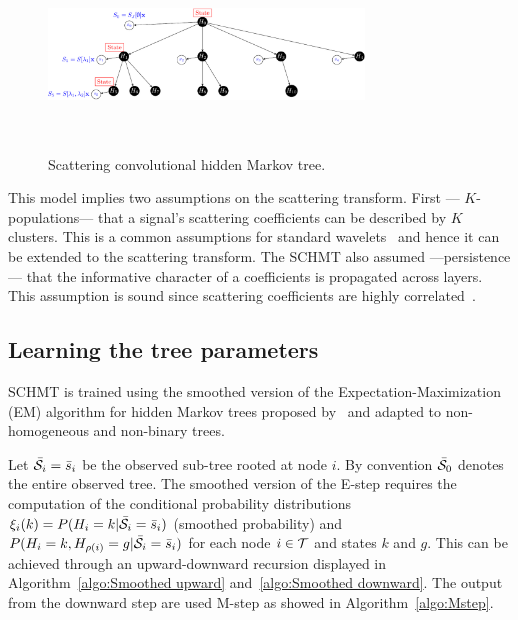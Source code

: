 \documentclass{article}
\begin{document}
    \begin{figure}
      \begin{center}
        \includegraphics[width=3.3in, height=2in, keepaspectratio]{scat_HMT_crop.pdf}
        \caption{Scattering convolutional hidden Markov tree.}
        \label{fig:SCHMT 1}
      \end{center}
      \vspace{-15pt}
    \end{figure}
    
    This model implies two assumptions on the scattering transform. First --- $K$-populations--- that a signal’s scattering coefficients can be described by $K$ clusters. This is a common assumptions for standard wavelets~\cite{kingsbury2001complex} and hence it can be extended to the scattering transform. The SCHMT also assumed ---persistence--- that the informative character of a coefficients is propagated across layers. This assumption is sound since scattering coefficients are highly correlated~\cite{oyallon2014deep}.
    
  \subsection{Learning the tree parameters}
    \label{subsec:SCHMT/Learning}    

    SCHMT is trained using the smoothed version of the Expectation-Maximization (EM) algorithm for hidden Markov trees proposed by~\cite{durand2001statistical} and adapted to non-homogeneous and non-binary trees.
    
    Let $\bar{\mathcal{S}}_{i}= \bar{s}_{i}$ be the observed sub-tree rooted at node $i$. By convention $\bar{\mathcal{S}}_{0}$ denotes the entire observed tree. The smoothed version of the E-step requires the computation of the conditional probability distributions $\xi_{i}(k) = P(H_{i}=k | \bar{\mathcal{S}}_{i}= \bar{s}_{i})$ (smoothed probability) and $P(H_{i}=k, H_{\rho(i)}=g | \bar{\mathcal{S}}_{i}= \bar{s}_{i})$ for each node $i \in \mathcal{T}$ and states $k$ and $g$. This can be achieved through an upward-downward recursion displayed in Algorithm~\ref{algo:Smoothed upward} and~\ref{algo:Smoothed downward}. The output from the downward step are used M-step as showed in Algorithm~\ref{algo:Mstep}.
    
\end{document}
